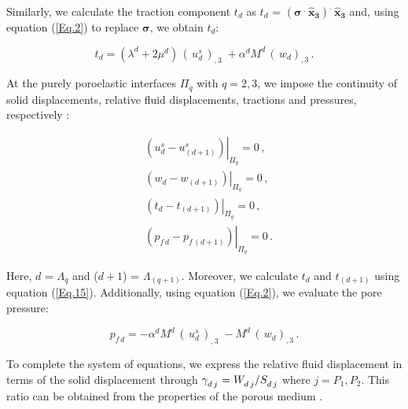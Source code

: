 \documentclass[draft]{agujournal2019}
\begin{document}
Similarly,  we calculate the traction component $t_d$ as $t_d$ = $(\bm{\sigma} \, ^{\bm{.}} \, \bm{\hat x_3}) ^{\bm{.}} \, \bm{\hat x_3}$ and, using equation (\ref{Eq.2}) to replace  $\bm{\sigma}$, we obtain $t_d$:

\begin{linenomath*}
\begin{equation}\label{Eq.15}
t_d =  (\lambda^d + 2 \mu^d)\,  \left( \, u_d ^s \, \right)_{,3}\; + \alpha^d M^d \,  \left( \, w_d \right)_{,3} \,.
\end{equation}
\end{linenomath*}

At the purely poroelastic interfaces $\Pi_q$ with $q=2,3$, we impose the continuity of solid displacements, relative fluid displacements, tractions and pressures, respectively \cite{Deresiewicz1963}:
\begin{linenomath*}
\begin{equation}\label{Eq.16}
\begin{split}
&  \left. \left( u_d^s -  u_{(d+1)}^s \right) \right \rvert_{\Pi_q} = 0 \,, \\
&  \left. \left(  w_d -  w_{(d+1)} \right) \right \rvert_{\Pi_q} = 0 \,, \\
& \left . \left(  t_d  - t_{(d+1)}  \right) \right \rvert_{\Pi_q}= 0 \,,\\
&  \left. \left(  p_{f\,d} -  p_{f\, (d+1)} \right) \right \rvert_{\Pi_q} = 0 \,.
\end{split}
\end{equation}
\end{linenomath*}
Here, $d$ = $\Lambda_q$ and ($d+1$) = $\Lambda_{(q+1)}$. Moreover, we calculate $t_d$ and $t_{(d+1)}$ using equation (\ref{Eq.15}). 
Additionally, using equation (\ref{Eq.2}), we evaluate the pore pressure:
\begin{linenomath*}
\begin{equation}\label{Eq.17}
p_{f \, d} = - \alpha^d M^d\,  \left( \, u_d^{s} \, \right)_{,3}\; - M^d \,  \left( \, w_d \right)_{,3} \, .
\end{equation}
\end{linenomath*}
To complete the system of equations, we express the relative fluid displacement in terms of the solid displacement through
 $\tensor []{\gamma}{_d_{\,j}}=\tensor*[]{W}{_d_{\, j}}/\tensor*[]{S}{_d_{\, j}}$ where $j=P_1, P_2$. This ratio can be  obtained from the properties of the porous medium \cite{Barbosa2016}.
 
\end{document}
